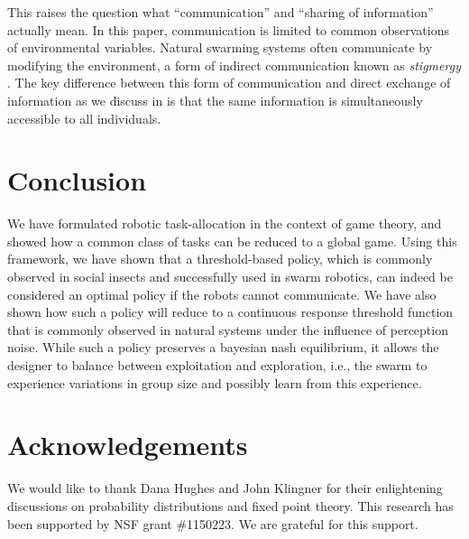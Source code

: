 \documentclass[conference]{ieeeconf}
\begin{document}
This raises the question what ``communication'' and ``sharing of information'' actually mean. In this paper, communication is limited to common observations of environmental variables. Natural swarming systems often communicate by modifying the environment, a form of indirect communication known as \emph{stigmergy} \cite{grasse1959reconstruction}. The key difference between this form of communication and direct exchange of information as we discuss in \cite{Touri2014} is that the same information is simultaneously accessible to all individuals. 

\section{Conclusion}\label{sec:conc}
We have formulated robotic task-allocation in the context of game theory, and showed how a common class of tasks can be reduced to a global game. Using this framework, we have shown that a threshold-based policy, which is commonly observed in social insects and successfully used in swarm robotics, can indeed be considered an optimal policy if the robots cannot communicate. We have also shown how such a policy will reduce to a continuous response threshold function that is commonly observed in natural systems under the influence of perception noise. While such a policy preserves a bayesian nash equilibrium, it allows the designer to balance between exploitation and exploration, i.e., the swarm to experience variations in group size and possibly learn from this experience. 

\section*{Acknowledgements}
We would like to thank Dana Hughes and John Klingner for their enlightening discussions on probability distributions and fixed point theory. This research has been supported by NSF grant \#1150223. We are grateful for this support.


\end{document}
